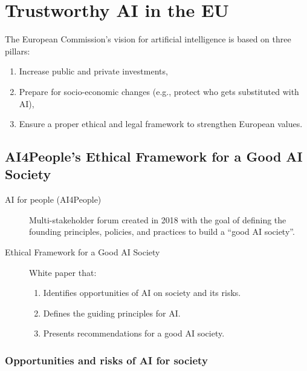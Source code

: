 \chapter{Trustworthy AI in the EU}


\begin{remark}
    The European Commission's vision for artificial intelligence is based on three pillars:
    \begin{enumerate}
        \item Increase public and private investments,
        \item Prepare for socio-economic changes (e.g., protect who gets substituted with AI),
        \item Ensure a proper ethical and legal framework to strengthen European values.
    \end{enumerate}
\end{remark}



\section{AI4People's Ethical Framework for a Good AI Society}

\begin{description}
    \item[AI for people (AI4People)] 
        Multi-stakeholder forum created in 2018 with the goal of defining the founding principles, policies, and practices to build a ``good AI society''.

    \item[Ethical Framework for a Good AI Society] 
        White paper that:
        \begin{enumerate}
            \item Identifies opportunities of AI on society and its risks.
            \item Defines the guiding principles for AI.
            \item Presents recommendations for a good AI society.
        \end{enumerate}
\end{description}


\subsection{Opportunities and risks of AI for society}

